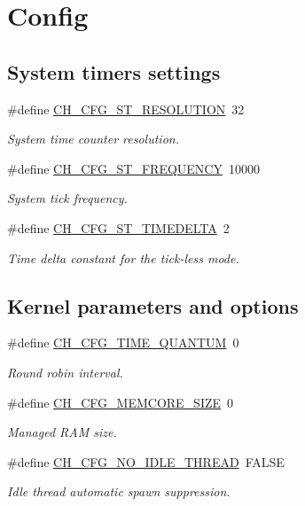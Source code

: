 \hypertarget{group__config}{\section{Config}
\label{group__config}
}
\subsection*{System timers settings}
\begin{DoxyCompactItemize}
\item 
\#define \hyperlink{group__config_ga2af9a4c66ec41bad799a27c94728c1ae}{C\+H\+\_\+\+C\+F\+G\+\_\+\+S\+T\+\_\+\+R\+E\+S\+O\+L\+U\+T\+I\+O\+N}~32
\begin{DoxyCompactList}\small\item\em System time counter resolution. \end{DoxyCompactList}\item 
\#define \hyperlink{group__config_ga174ac107e620ac81bb1487c1ad7ad839}{C\+H\+\_\+\+C\+F\+G\+\_\+\+S\+T\+\_\+\+F\+R\+E\+Q\+U\+E\+N\+C\+Y}~10000
\begin{DoxyCompactList}\small\item\em System tick frequency. \end{DoxyCompactList}\item 
\#define \hyperlink{group__config_ga11ec0b9fb6a84d32dbc8567cc4af4d17}{C\+H\+\_\+\+C\+F\+G\+\_\+\+S\+T\+\_\+\+T\+I\+M\+E\+D\+E\+L\+T\+A}~2
\begin{DoxyCompactList}\small\item\em Time delta constant for the tick-\/less mode. \end{DoxyCompactList}\end{DoxyCompactItemize}
\subsection*{Kernel parameters and options}
\begin{DoxyCompactItemize}
\item 
\#define \hyperlink{group__config_ga20a364f069f854ccdba167f2cca2526f}{C\+H\+\_\+\+C\+F\+G\+\_\+\+T\+I\+M\+E\+\_\+\+Q\+U\+A\+N\+T\+U\+M}~0
\begin{DoxyCompactList}\small\item\em Round robin interval. \end{DoxyCompactList}\item 
\#define \hyperlink{group__config_ga185a9549f0d212530070e806680c4949}{C\+H\+\_\+\+C\+F\+G\+\_\+\+M\+E\+M\+C\+O\+R\+E\+\_\+\+S\+I\+Z\+E}~0
\begin{DoxyCompactList}\small\item\em Managed R\+A\+M size. \end{DoxyCompactList}\item 
\#define \hyperlink{group__config_ga8c0d4e5b775c997167737f0ca65eb11e}{C\+H\+\_\+\+C\+F\+G\+\_\+\+N\+O\+\_\+\+I\+D\+L\+E\+\_\+\+T\+H\+R\+E\+A\+D}~F\+A\+L\+S\+E
\begin{DoxyCompactList}\small\item\em Idle thread automatic spawn suppression. \end{DoxyCompactList}\end{DoxyCompactItemize}
